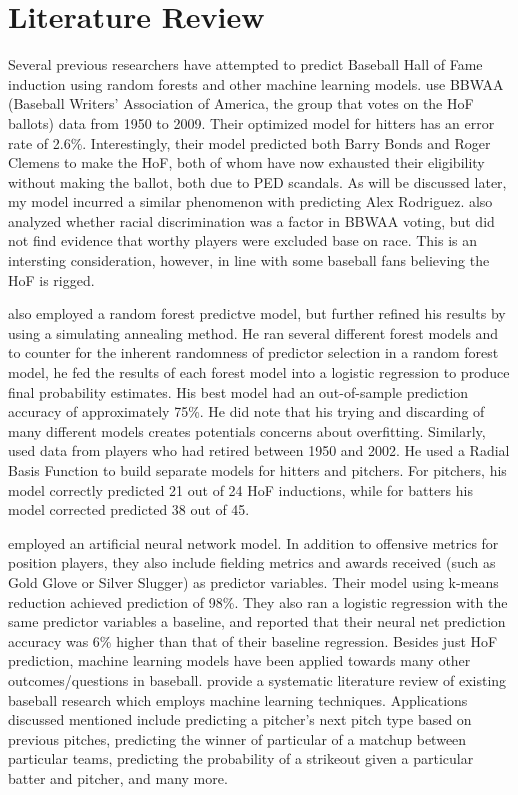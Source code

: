 \documentclass[12pt,english]{article}
\begin{document}
\section{Literature Review}\label{sec:litreview}
Several previous researchers have attempted to predict Baseball Hall of Fame induction using random forests and other machine learning models. \cite{mills2011} use BBWAA (Baseball Writers' Association of America, the group that votes on the HoF ballots) data from 1950 to 2009. Their optimized model for hitters has an error rate of 2.6\%. Interestingly, their model predicted both Barry Bonds and Roger Clemens to make the HoF, both of whom have now exhausted their eligibility without making the ballot, both due to PED scandals. As will be discussed later, my model incurred a similar phenomenon with predicting Alex Rodriguez. \cite{mills2011} also analyzed whether racial discrimination was a factor in BBWAA voting, but did not find evidence that worthy players were excluded base on race. This is an intersting consideration, however, in line with some baseball fans believing the HoF is rigged.

\cite{freiman2010} also employed a random forest predictve model, but further refined his results by using a simulating annealing method. He ran several different forest models and to counter for the inherent randomness of predictor selection in a random forest model, he fed the results of each forest model into a logistic regression to produce final probability estimates. His best model had an out-of-sample prediction accuracy of approximately 75\%. He did note that his trying and discarding of many different models creates potentials concerns about overfitting. Similarly, \cite{smith2009} used data from players who had retired between 1950 and 2002. He used a Radial Basis Function to build separate models for hitters and pitchers. For pitchers, his model correctly predicted 21 out of 24 HoF inductions, while for batters his model corrected predicted 38 out of 45. 

\cite{young2008} employed an artificial neural network model. In addition to offensive metrics for position players, they also include fielding metrics and awards received (such as Gold Glove or Silver Slugger) as predictor variables. Their model using k-means reduction achieved prediction of 98\%. They also ran a logistic regression with the same predictor variables a baseline, and reported that their neural net prediction accuracy was 6\% higher than that of their baseline regression. Besides just HoF prediction, machine learning models have been applied towards many other outcomes/questions in baseball. \cite{koseler2018} provide a systematic literature review of existing baseball research which employs machine learning techniques. Applications discussed mentioned include predicting a pitcher's next pitch type based on previous pitches, predicting the winner of particular of a matchup between particular teams, predicting the probability of a strikeout given a particular batter and pitcher, and many more. 
\end{document}
